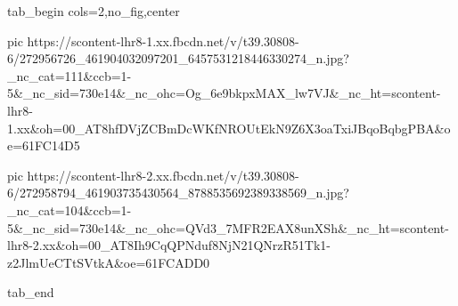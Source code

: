  
 
 
 
 


\ifcmt
  tab_begin cols=2,no_fig,center

     pic https://scontent-lhr8-1.xx.fbcdn.net/v/t39.30808-6/272956726_461904032097201_6457531218446330274_n.jpg?_nc_cat=111&ccb=1-5&_nc_sid=730e14&_nc_ohc=Og_6e9bkpxMAX_lw7VJ&_nc_ht=scontent-lhr8-1.xx&oh=00_AT8hfDVjZCBmDcWKfNROUtEkN9Z6X3oaTxiJBqoBqbgPBA&oe=61FC14D5
     
     pic https://scontent-lhr8-2.xx.fbcdn.net/v/t39.30808-6/272958794_461903735430564_8788535692389338569_n.jpg?_nc_cat=104&ccb=1-5&_nc_sid=730e14&_nc_ohc=QVd3_7MFR2EAX8unXSh&_nc_ht=scontent-lhr8-2.xx&oh=00_AT8Ih9CqQPNduf8NjN21QNrzR51Tk1-z2JlmUeCTtSVtkA&oe=61FCADD0

  tab_end
\fi
